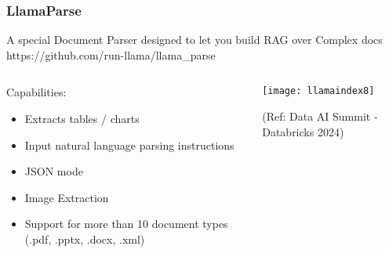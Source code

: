 \begin{frame}[fragile]\frametitle{LlamaParse}
A special Document Parser designed to let you build RAG over Complex docs
https://github.com/run-llama/llama\_parse


\begin{columns}
    \begin{column}[T]{0.4\linewidth}
Capabilities:
		\begin{itemize}
		\item Extracts tables / charts
		\item Input natural language parsing instructions
		\item JSON mode
		\item Image Extraction
		\item Support for more than 10 document types (.pdf, .pptx, .docx, .xml)

		\end{itemize}	
		
    \end{column}
    \begin{column}[T]{0.6\linewidth}
		\begin{center}
		\texttt{[image: llamaindex8]}

		{\tiny (Ref: Data AI Summit - Databricks 2024)}
		\end{center}
    \end{column}
  \end{columns}
  
\end{frame}

